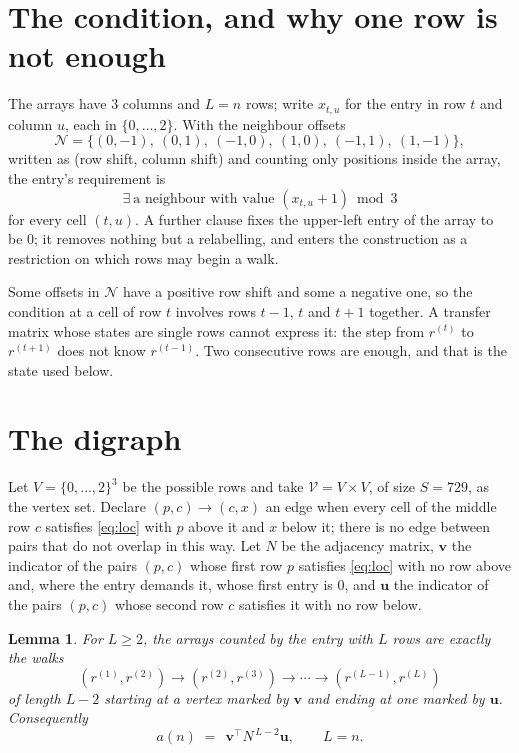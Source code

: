 \documentclass[11pt,a4paper]{article}
\theoremstyle{plain}
\newtheorem{lemma}[theorem]{Lemma}
\theoremstyle{definition}
\begin{document}
\section{The condition, and why one row is not enough}

The arrays have $3$ columns and $L=n$ rows; write $x_{t,u}$ for the entry in
row $t$ and column $u$, each in $\{0,\dots,2\}$. With the neighbour offsets
\[
\mathcal N=\{(0,-1),\ (0,1),\ (-1,0),\ (1,0),\ (-1,1),\ (1,-1)\},
\]
written as (row shift, column shift) and counting only positions inside the array, the
entry's requirement is
\begin{equation}\label{eq:loc}
\exists\ \text{a neighbour with value }(x_{t,u}+1)\bmod 3
\end{equation}
for every cell $(t,u)$. A further clause fixes the upper-left entry of the array to be $0$; it removes nothing but a relabelling, and enters the construction as a restriction on which rows may begin a walk.

Some offsets in $\mathcal N$ have a positive row shift and some a negative one, so the
condition at a cell of row $t$ involves rows $t-1$, $t$ and $t+1$ together. A transfer
matrix whose states are single rows cannot express it: the step from $r^{(t)}$ to
$r^{(t+1)}$ does not know $r^{(t-1)}$. Two consecutive rows are enough, and that is
the state used below.

\section{The digraph}

Let $V=\{0,\dots,2\}^{3}$ be the possible rows and take
$\mathcal V=V\times V$, of size $S=729$, as the vertex set. Declare $(p,c)\to(c,x)$ an edge
when every cell of the middle row $c$ satisfies \eqref{eq:loc} with $p$ above it and $x$
below it; there is no edge between pairs that do not overlap in this way. Let $N$ be the
adjacency matrix, $\mathbf{v}$ the indicator of the pairs $(p,c)$ whose first row $p$
satisfies \eqref{eq:loc} with no row above and, where the entry demands it, whose first entry is $0$, and $\mathbf{u}$ the indicator of
the pairs $(p,c)$ whose second row $c$ satisfies it with no row below.

\begin{lemma}\label{lem:walk}
For $L\ge2$, the arrays counted by the entry with $L$ rows are exactly the walks
\[
(r^{(1)},r^{(2)})\to(r^{(2)},r^{(3)})\to\cdots\to(r^{(L-1)},r^{(L)})
\]
of length $L-2$ starting at a vertex marked by $\mathbf{v}$ and ending at one marked by
$\mathbf{u}$. Consequently
\[
a(n)\;=\;\,\mathbf{v}^{\!\top}N^{\,L-2}\mathbf{u},\qquad L=n .
\]
\end{lemma}
\end{document}
